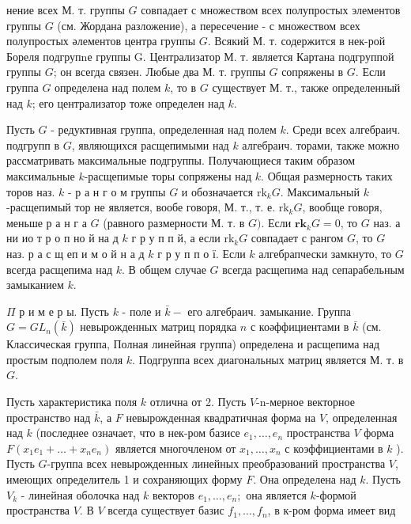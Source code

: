 \documentclass[10pt]{article}
\begin{document}
нение всех М. т. группы $G$ совпадает с множеством всех полупростых элементов группы $G$ (см. Жордана разложение), а пересечение - с множеством всех полупростых әлементов центра группы $G$. Всякий М. т. содержится в нек-рой Бореля подгрупnе группы G. Централизатор М. т. является Картана подгруппой группы $G$; он всегда связен. Любые два М. т. группы $G$ сопряжены в $G$. Если группа $G$ определена над полем $k$, то в $G$ существует М. т., также определенный над $k$; его централизатор тоже определен над $k$.



Пусть $G$ - редуктивная группа, определенная над полем $k$. Среди всех алгебраич. подгрупп в $G$, являющихся расщепимыми над $k$ алгебраич. торами, также можно рассматривать максимальные подгруппы. Получающиеся таким образом максимальные $k$-расщепимые торы сопряжены над $k$. Общая размерность таких торов наз. $k$ - р а н г о м группы $G$ и обозначается $\mathrm{rk}_{k} G$. Максимальный $k$-расщепимый тор не является, вообе говоря, М. т., т. е. $\mathrm{rk}_{k} G$, вообще говоря, меньше р а н г а $G$ (равного размерности М. т. в $G)$. Если $\mathbf{r k}_{k} G=0$, то $G$ наз. а ни ио т р о п но й на д $k$ г р у п п й, а если $\mathrm{rk}_{k} G$ совпадает с рангом $G$, то $G$ наз. р а с щ $\mathbf{е} п$ и м о й н а д $k$ г р у п п о ї. Если $k$ алгебрапчески замкнуто, то $G$ всегда расщепима над $k$. В общем случае $G$ всегда расщепима над сепарабельным замыканием $k$.



$\Pi$ р и м е р ы. Пусть $k$ - поле и $\bar{k}-$ его алгебраич. замыкание. Группа $G=G L_{n}(\bar{k})$ невырожденных матриц порядка $n$ с коәффициентами в $\bar{k}$ (см. Классическая группа, Полная линейная группа) определена и расщепима над простым подполем поля $k$. Подгруппа всех диагональных матриц является М. т. в $G$.



Пусть характеристика поля $k$ отлична от 2. Пусть $V$-n-мерное векторное пространство над $\bar{k}$, а $F$ невырожденная квадратичная форма на $V$, определенная над $k$ (последнее означает, что в нек-ром базисе $e_{1}, \ldots, e_{n}$ пространства $V$ форма $F\left(x_{1} e_{1}+\ldots+x_{n} e_{n}\right)$ является многочленом от $x_{1}, \ldots, x_{n}$ с коэффициентами в $k$ ). Пусть $G$-группа всех невырожденных линейных преобразований пространства $V$, имеющих определитель 1 и сохраняющих форму $F$. Она определена над $k$. Пусть $V_{k}$ - линейная оболочка над $k$ векторов $e_{1}, \ldots, e_{n} ;$ она является $k$-формой пространства $V$. В $V$ всегда существует базис $f_{1}, \ldots, f_{n}$, в к-ром форма имеет вид
\end{document}
